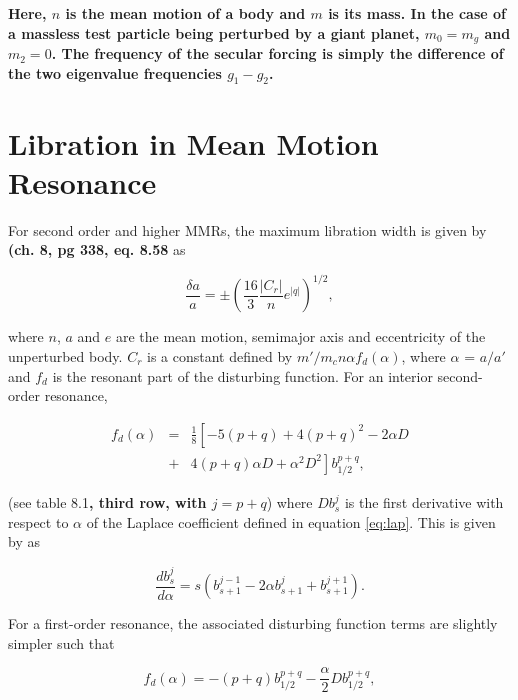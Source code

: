 \documentclass[fleqn,usenatbib]{mnras}
\begin{document}
\noindent \textbf{Here, $n$ is the mean motion of a body and $m$ is its mass. In the case of a massless test particle being perturbed by a giant planet, $m_{0} = m_{g}$ and $m_{2} = 0$. The frequency of the secular forcing is simply the difference of the two eigenvalue frequencies $g_{1} - g_{2}$.}

\section{Libration in Mean Motion Resonance}\label{sec:libration}

For second order and higher MMRs, the maximum libration width is given by \citet{1999ssd..book.....M} \textbf{(ch. 8, pg 338, eq. 8.58} as

\begin{equation}\label{eq:res_so}
	\frac{\delta a}{a} = \pm \left( \frac{16}{3} \frac{\left| C_{r} \right|}{n} e^{\left| q \right|} \right)^{1/2},
\end{equation}

\noindent where $n$, $a$ and $e$ are the mean motion, semimajor axis and eccentricity of the unperturbed body. $C_{r}$ is a constant defined by 
$m'/m_{c} n \alpha f_{d}(\alpha)$, where $\alpha$ = $a/a'$ and $f_{d}$ is the resonant part of the disturbing function. For an interior second-order 
resonance,

\begin{eqnarray}\label{eq:fd_so}
	f_{d} (\alpha) &=& \frac{1}{8} \left[ -5(p+q) + 4(p+q)^{2} - 2 \alpha D \right. \\ \nonumber
	                      & + & \left. 4(p+q) \alpha D + \alpha^{2} D^{2} \right] b^{p+q}_{1/2},
\end{eqnarray}

\noindent (see \citet{1999ssd..book.....M} table 8.1\textbf{, third row, with $j = p + q$}) where $D b^{j}_{s}$ is the first derivative with respect to $\alpha$ of the Laplace coefficient defined in equation \ref{eq:lap}. This is given by \citet{1961mcm..book.....B} as

\begin{equation}\label{eq:lap_d}
	\frac{d b_{s}^{j}}{d \alpha} = s \left( b_{s+1}^{j-1} - 2 \alpha b_{s+1}^{j} + b_{s+1}^{j+1} \right).
\end{equation}

For a first-order resonance, the associated disturbing function terms are slightly simpler such that

\begin{equation}\label{eq:fd_fo}
	f_{d}(\alpha) = -(p+q) b_{1/2}^{p+q} - \frac{\alpha}{2} D b_{1/2}^{p+q},
\end{equation}
\end{document}
